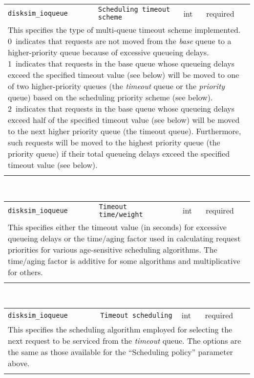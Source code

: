 \noindent 
\begin{tabular}{|p{\lpmodwidth}|p{\lpnamewidth}|p{0.5in}|p{0.5in}|}
\cline{1-4}
\texttt{disksim\_ioqueue} & \texttt{Scheduling timeout scheme} & int & required \\ 
\cline{1-4}
\multicolumn{4}{|p{6in}|}{
This specifies the type of multi-queue timeout scheme implemented.
0~indicates that requests are not moved from the {\it base} queue to a
higher-priority queue because of excessive queueing delays.
1~indicates that requests in the base queue whose queueing delays exceed
the specified timeout value (see below) will be moved to one of two
higher-priority queues (the {\it timeout} queue or the {\it priority}
queue) based on the scheduling priority scheme (see below).
2~indicates that requests in the base queue whose queueing
delays exceed half of the specified timeout value (see below) will be moved to
the next higher priority queue (the timeout queue). Furthermore, such
requests will be moved to the highest priority queue (the priority queue)
if their total queueing delays exceed the specified timeout value (see below).
}\\ 
\cline{1-4}
\multicolumn{4}{p{5in}}{}\\
\end{tabular}\\ 
\noindent 
\begin{tabular}{|p{\lpmodwidth}|p{\lpnamewidth}|p{0.5in}|p{0.5in}|}
\cline{1-4}
\texttt{disksim\_ioqueue} & \texttt{Timeout time/weight} & int & required \\ 
\cline{1-4}
\multicolumn{4}{|p{6in}|}{
This specifies either the timeout value (in seconds) for excessive
queueing delays or the time/aging factor used in calculating request
priorities for various age-sensitive scheduling algorithms. The
time/aging factor is additive for some algorithms and multiplicative
for others.
}\\ 
\cline{1-4}
\multicolumn{4}{p{5in}}{}\\
\end{tabular}\\ 
\noindent 
\begin{tabular}{|p{\lpmodwidth}|p{\lpnamewidth}|p{0.5in}|p{0.5in}|}
\cline{1-4}
\texttt{disksim\_ioqueue} & \texttt{Timeout scheduling} & int & required \\ 
\cline{1-4}
\multicolumn{4}{|p{6in}|}{
This specifies the scheduling algorithm employed for selecting the next
request to be serviced from the {\it timeout} queue. The options are
the same as those available for the ``Scheduling policy'' parameter
above.
}\\ 
\cline{1-4}
\multicolumn{4}{p{5in}}{}\\
\end{tabular}\\ 
